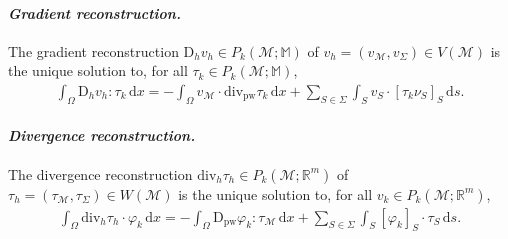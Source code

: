 \documentclass[a4paper]{amsart}
\numberwithin{equation}{section}
\newcommand{\R}{\mathbb{R}}
\renewcommand{\d}[1]{\,\mathrm{d}#1}
\renewcommand{\div}{\mathrm{div}}
\newcommand{\Mcal}{\mathcal{M}}
\newcommand{\pw}{\mathrm{pw}}
\newcommand{\D}{\mathrm{D}}
\newcommand{\M}{\mathbb{M}}
\theoremstyle{remark}
\begin{document}
\paragraph{\emph{Gradient reconstruction.}} The gradient reconstruction $\D_h v_h \in P_k(\Mcal;\M)$ of $v_h = (v_\Mcal,v_\Sigma) \in V(\Mcal)$ is the unique solution to, for all $\tau_k \in P_k(\Mcal;\M)$,
\begin{align}
	\int_\Omega \D_h v_h : \tau_k \d{x} = - \int_\Omega v_\Mcal \cdot \div_\pw \tau_k \d{x} + \sum_{S \in \Sigma} \int_S v_S \cdot [\tau_k \nu_S]_S \d{s}.
	\label{def:gradient-reconstruction}
\end{align}

\paragraph{\emph{Divergence reconstruction.}} The divergence reconstruction $\div_h \tau_h \in P_k(\Mcal;\R^m)$ of $\tau_h = (\tau_\Mcal,\tau_\Sigma) \in W(\Mcal)$ is the unique solution to, for all $v_k \in P_k(\Mcal;\R^m)$,
\begin{align}
	\int_\Omega \div_h \tau_h \cdot \varphi_{k} \d{x} = - \int_\Omega \D_\pw \varphi_{k} : \tau_\Mcal \d{x} + \sum_{S \in \Sigma} \int_S [\varphi_k]_S \cdot \tau_S \d{s}.
	\label{def:divergence-reconstruction}
\end{align}
\end{document}
